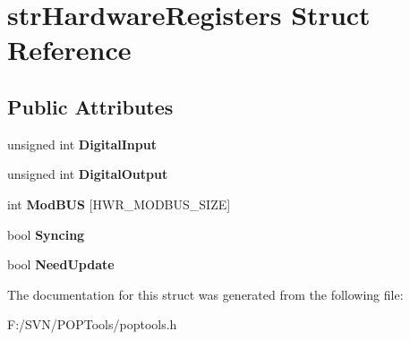 \hypertarget{structstr_hardware_registers}{\section{str\-Hardware\-Registers Struct Reference}
\label{structstr_hardware_registers}
}
\subsection*{Public Attributes}
\begin{DoxyCompactItemize}
\item 
\hypertarget{structstr_hardware_registers_a0e290696b1019bc85756ebd675c6ddb5}{unsigned int {\bfseries Digital\-Input}}\label{structstr_hardware_registers_a0e290696b1019bc85756ebd675c6ddb5}

\item 
\hypertarget{structstr_hardware_registers_a5b22556d98c96e850e668aada52f2b65}{unsigned int {\bfseries Digital\-Output}}\label{structstr_hardware_registers_a5b22556d98c96e850e668aada52f2b65}

\item 
\hypertarget{structstr_hardware_registers_a48867e1f43e7841783d860932d0a6090}{int {\bfseries Mod\-B\-U\-S} \mbox{[}H\-W\-R\-\_\-\-M\-O\-D\-B\-U\-S\-\_\-\-S\-I\-Z\-E\mbox{]}}\label{structstr_hardware_registers_a48867e1f43e7841783d860932d0a6090}

\item 
\hypertarget{structstr_hardware_registers_a27d20a3ab139cbf4c6819c38482671a5}{bool {\bfseries Syncing}}\label{structstr_hardware_registers_a27d20a3ab139cbf4c6819c38482671a5}

\item 
\hypertarget{structstr_hardware_registers_a7b5e8fc07658b6e83b6e0334c97ea1a9}{bool {\bfseries Need\-Update}}\label{structstr_hardware_registers_a7b5e8fc07658b6e83b6e0334c97ea1a9}

\end{DoxyCompactItemize}


The documentation for this struct was generated from the following file\-:\begin{DoxyCompactItemize}
\item 
F\-:/\-S\-V\-N/\-P\-O\-P\-Tools/poptools.\-h\end{DoxyCompactItemize}
